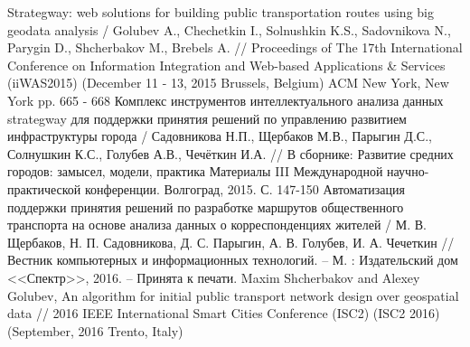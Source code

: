 \renewcommand{\bibname}{Публикации по теме диссертации}
\begin{thebibliography}{10}
     Strategway: web solutions for building public transportation routes using big geodata 
        analysis / Golubev A., Chechetkin I., Solnushkin K.S., Sadovnikova N., Parygin D., Shcherbakov M., 
        Brebels A. // Proceedings of The 17th International Conference on Information Integration and 
        Web-based Applications \& Services (iiWAS2015) (December 11 - 13, 2015 Brussels, Belgium) 
        ACM New York, New York pp. 665 - 668
     Комплекс инструментов интеллектуального анализа данных strategway для поддержки 
        принятия решений по управлению развитием инфраструктуры города / Садовникова Н.П., Щербаков М.В., 
        Парыгин Д.С., Солнушкин К.С., Голубев А.В., Чечёткин И.А. // В сборнике: Развитие средних 
        городов: замысел, модели, практика Материалы III Международной научно-практической конференции. 
        Волгоград, 2015. С. 147-150
     Автоматизация поддержки принятия решений по разработке маршрутов общественного 
        транспорта на основе анализа данных о корреспонденциях жителей / М. В. Щербаков, 
        Н. П. Садовникова, Д. С. Парыгин, А. В. Голубев, И. А. Чечеткин // Вестник компьютерных и 
        информационных технологий. -- М. : Издательский дом <<Спектр>>, 2016. -- Принята к печати.
     Maxim Shcherbakov and Alexey Golubev, An algorithm for initial public transport network 
        design over geospatial data // 2016 IEEE International Smart Cities Conference (ISC2) (ISC2 2016) 
        (September, 2016 Trento, Italy)
\end{thebibliography}